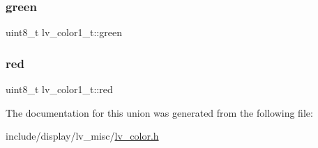 \mbox{\label{unionlv__color1__t_a842588a68947b7c67e7e568740982c36}} 
\subsubsection{\texorpdfstring{green}{green}}
{\footnotesize\ttfamily uint8\+\_\+t lv\+\_\+color1\+\_\+t\+::green}

\mbox{\label{unionlv__color1__t_a43b5e095f8632b825693462b85b22132}} 
\subsubsection{\texorpdfstring{red}{red}}
{\footnotesize\ttfamily uint8\+\_\+t lv\+\_\+color1\+\_\+t\+::red}



The documentation for this union was generated from the following file\+:\begin{DoxyCompactItemize}
\item 
include/display/lv\+\_\+misc/\mbox{\hyperlink{lv__color_8h}{lv\+\_\+color.\+h}}\end{DoxyCompactItemize}
